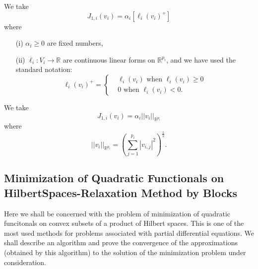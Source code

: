 \begin{example}\label{chap4-exam4.2}
We take
$$
J_{1, i}(v_{i}) = \alpha_{i} [\ell_{i} (v_{i})^{+}]
$$
where
\begin{enumerate}
\item[(i)] $\alpha_{i} \geq 0$ are fixed numbers,

\item[(ii)] $\ell_{i} : V_{i} \to \mathbb{R}$ are continuous linear forms on $\mathbb{R}^{p_{i}}$, and we have used the standard notation:
\begin{equation*}
\ell_{i}(v_{i})^{+} = 
\begin{cases}
& \ell_{i}(v_{i}) \text{ when } \ell_{i}(v_{i}) \geq 0\\
& 0 \text{ when } \ell_{i} (v_{i}) < 0.
\end{cases}
\end{equation*}
\end{enumerate}
\end{example}

\begin{example}\label{chap4-exam4.3}
We take
$$
J_{1, i}(v_{i}) = \alpha_{i} ||v_{i}||_{\mathbb{R}^{p_{i}}}
$$
where
$$
|| v_{i} ||_{\mathbb{R}^{p_{i}}} = \left(\sum_{j=1}^{p_{i}} |v_{i, j}|^{2} \right)^{\frac{1}{2}}.
$$
\end{example}

\subsection[Minimization of Quadratic Functionals on
  Hilbert...]{Minimization of Quadratic Functionals on
  Hilbert\hfil\break Spaces-Relaxation Method by
  Blocks}\label{chap4-subsec4.5} 
Here we shall be concerned with the problem of minimization of quadra\-tic funcitonals on convex subsets of a product of Hilbert spaces. This is one of the most used methods for problems associated with partial differential equations. We shall describe an algorithm and prove the convergence of the approximations (obtained by this algorithm) to the solution of the minimization problem under consideration.

